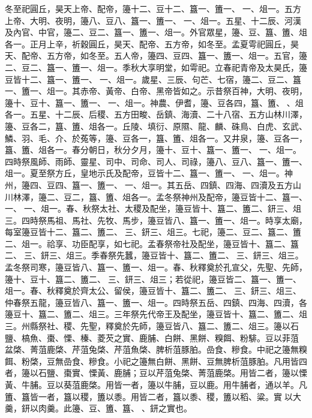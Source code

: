 \begin{pinyinscope}
 冬至祀圓丘，昊天上帝、配帝，籩十二、豆十二、簋一、簠一、一、俎一。五方上帝、大明、夜明，籩八、豆八、簋一、簠一、一、俎一。五星、十二辰、河漢及內官、中官，籩二、豆二、簋一、簠一、俎一。外官眾星，籩、豆、簋、簠、俎各一。正月上辛，祈穀圓丘，昊天、配帝、五方帝，如冬至。孟夏雩祀圓丘，昊天、配帝、五方帝，如冬至。五人帝，籩四、豆四、簋一、簠一、俎一。五官，籩二、豆二、簋一、簠一、俎一。季秋大享明堂，如雩祀。立春祀青帝及太昊氏，籩豆皆十二、簋一、簠一、一、俎一。歲星、三辰、句芒、七宿，籩二、豆二、簋一、簠一、俎一。其赤帝、黃帝、白帝、黑帝皆如之。示昔祭百神，大明、夜明，籩十、豆十、簋一、簠一、一、俎一。神農、伊耆，籩、豆各四，簋、簠、、俎各一。五星、十二辰、后稷、五方田畯、岳鎮、海瀆、二十八宿、五方山林川澤，籩、豆各二，簋、簠、俎各一。丘陵、填衍、原隰、龍、麟、硃鳥、白虎、玄武、鱗、羽、毛、介、於菟等，籩、豆各一，簋、簠、俎各一。又井泉，籩、豆各一，簋、簠、俎各一。春分朝日，秋分夕月，籩十、豆十、簋一、簠一、一、俎一。四時祭風師、雨師、靈星、司中、司命、司人、司祿，籩八、豆八、簋一、簠一、俎一。夏至祭方丘，皇地示氏及配帝，豆皆十二、簋一、簠一、一、俎一。神州，籩四、豆四、簋一、簠一、一、俎一。其五岳、四鎮、四海、四瀆及五方山川林澤，籩二、豆二，簋、簠、俎各一。孟冬祭神州及配帝，籩豆皆十二、簋一、一、一、俎一。春、秋祭太社、太稷及配坐，籩豆皆十、簋二、簠二、鈃三、俎三。四時祭馬祖、馬社、先牧、馬步，籩豆皆八、簋一、簠一、俎一。時享太廟，每室籩豆皆十二、簋二、簠二、三、鈃三、俎三。七祀，籩二、豆二、簋二、簠二、俎一。祫享、功臣配享，如七祀。孟春祭帝社及配坐，籩豆皆十、簋二、簋二、三、鈃三、俎三。季春祭先蠶，籩豆皆十、簋二、簠二、三、鈃三、俎三。孟冬祭司寒，籩豆皆八、簋一、簠一、俎一。春、秋釋奠於孔宣父，先聖、先師，籩十、豆十、簋二、簠二、三、鈃三、俎三；若從祀，籩豆皆二、簋一、簠一、俎一。春、秋釋奠於齊太公、留侯，籩豆皆十、簋二、簠二、三、鈃三、俎三、仲春祭五龍，籩豆皆八、簋一、簠一、俎一。四時祭五岳、四鎮、四海、四瀆，各籩豆十、簋二、簠二、俎三。三年祭先代帝王及配坐，籩豆皆十、簋二、簠二、俎三。州縣祭社、稷、先聖，釋奠於先師，籩豆皆八、簋二、簠二、俎三。籩以石鹽、槁魚、棗、慄、榛、菱芡之實、鹿脯、白餅、黑餅、糗餌、粉騑。豆以菲菹盆棨、菁菹鹿棨、芹菹兔棨、芹菹魚棨、脾析菹豚胉。嵒食、糝食。中祀之籩無糗餌、粉棨，豆無嵒食、糝食。小祀之籩無白餅、黑餅、豆無脾析菹豚胉。凡用皆四者，籩以石鹽、棗實、慄黃、鹿脯；豆以芹菹兔棨、菁菹鹿棨。用皆二者，籩以慄黃、牛脯。豆以葵菹鹿棨。用皆一者，籩以牛脯，豆以鹿。用牛脯者，通以羊。凡簠、簋皆一者，簋以稷，簠以黍。用皆二者，簋以黍、稷，簠以稻、粱。實以大羹，鈃以肉羹。此籩、豆、簠、簋、、鈃之實也。




\end{pinyinscope}
